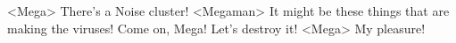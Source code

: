 <Mega> There's a Noise cluster! 
<Megaman> It might be these things that are making the viruses! 
Come on, Mega! Let's destroy it! 
<Mega> My pleasure! 

